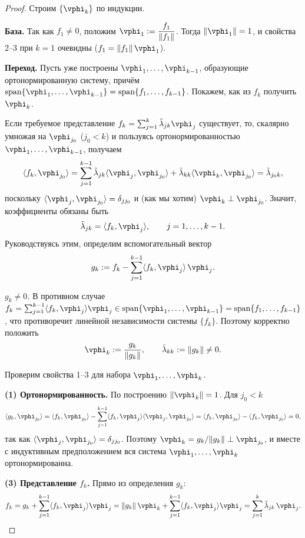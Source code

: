 \begin{proof}
	Строим $\{\vphi_k\}$ по индукции.

	\textbf{База.} Так как $f_1 \neq 0$, положим $\vphi_1 := \dfrac{f_1}{\|f_1\|}$. Тогда $\|\vphi_1\| = 1$, и свойства 2--3 при $k = 1$ очевидны ($f_1 = \|f_1\|\,\vphi_1$).

	\textbf{Переход.} Пусть уже построены $\vphi_1, \ldots, \vphi_{k-1}$, образующие ортонормированную систему, причём $\operatorname{span}\{\vphi_1, \ldots, \vphi_{k-1}\} = \operatorname{span}\{f_1, \ldots, f_{k-1}\}$. Покажем, как из $f_k$ получить $\vphi_k$.

	Если требуемое представление $f_k = \sum_{j=1}^{k} \tilde{\lambda}_{jk}\vphi_j$ существует, то, скалярно умножая на $\vphi_{j_0}$ ($j_0 < k$) и пользуясь ортонормированностью $\vphi_1, \ldots, \vphi_{k-1}$, получаем
	\[
	\langle f_k, \vphi_{j_0}\rangle = \sum_{j=1}^{k-1} \tilde{\lambda}_{jk}\langle \vphi_j, \vphi_{j_0}\rangle + \tilde{\lambda}_{kk}\langle \vphi_k, \vphi_{j_0}\rangle = \tilde{\lambda}_{j_0 k},
	\]
	поскольку $\langle \vphi_j, \vphi_{j_0}\rangle = \delta_{j j_0}$ и (как мы хотим) $\vphi_k \perp \vphi_{j_0}$. Значит, коэффициенты обязаны быть
	\[
	\tilde{\lambda}_{jk} = \langle f_k, \vphi_j\rangle, \qquad j = 1, \ldots, k-1.
	\]
	Руководствуясь этим, определим вспомогательный вектор
	\[
	g_k := f_k - \sum_{j=1}^{k-1} \langle f_k, \vphi_j\rangle\, \vphi_j.
	\]

	\emph{$g_k \neq 0$.} В противном случае $f_k = \sum_{j=1}^{k-1}\langle f_k, \vphi_j\rangle \vphi_j \in \operatorname{span}\{\vphi_1, \ldots, \vphi_{k-1}\} = \operatorname{span}\{f_1, \ldots, f_{k-1}\}$, что противоречит линейной независимости системы $\{f_k\}$. 
	Поэтому корректно положить
	\[
	\vphi_k := \frac{g_k}{\|g_k\|}, \qquad \tilde{\lambda}_{kk} := \|g_k\| \neq 0.
	\]

	Проверим свойства 1--3 для набора $\vphi_1, \ldots, \vphi_k$.

	\textbf{(1) Ортонормированность.} По построению $\|\vphi_k\| = 1$. Для $j_0 < k$
	\[
	\langle g_k, \vphi_{j_0}\rangle
	= \langle f_k, \vphi_{j_0}\rangle - \sum_{j=1}^{k-1} \langle f_k, \vphi_j\rangle \langle \vphi_j, \vphi_{j_0}\rangle
	= \langle f_k, \vphi_{j_0}\rangle - \langle f_k, \vphi_{j_0}\rangle = 0,
	\]
	так как $\langle \vphi_j, \vphi_{j_0}\rangle = \delta_{j j_0}$. Поэтому $\vphi_k = g_k/\|g_k\| \perp \vphi_{j_0}$, и вместе с индуктивным предположением вся система $\vphi_1, \ldots, \vphi_k$ ортонормированна.

	\textbf{(3) Представление $f_k$.} Прямо из определения $g_k$:
	\[
	f_k = g_k + \sum_{j=1}^{k-1}\langle f_k, \vphi_j\rangle \vphi_j
	= \|g_k\|\,\vphi_k + \sum_{j=1}^{k-1}\langle f_k, \vphi_j\rangle \vphi_j
	= \sum_{j=1}^{k} \tilde{\lambda}_{jk}\,\vphi_j.
	\]


\end{proof}
